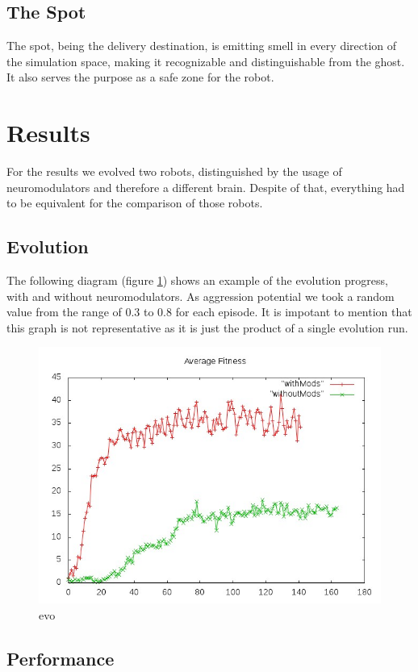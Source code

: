 \documentclass[12pt,fleqn,a4paper]{article}
\begin{document}
\subsection{The Spot}
The spot, being the delivery destination, is emitting smell in every direction of the simulation space, making it recognizable and distinguishable from the ghost. It also serves the purpose as a safe zone for the robot.

\section{Results}
For the results we evolved two robots, distinguished by the usage of neuromodulators and therefore a different brain. Despite of that, everything had to be equivalent for the comparison of those robots.
\newpage

\subsection{Evolution}
The following diagram (figure \ref{fig:diagram1}) shows an example of the evolution progress, with and without neuromodulators. As aggression potential we took a random value from the range of 0.3 to 0.8 for each episode. It is impotant to mention that this graph is not representative as it is just the product of a single evolution run.
\begin{figure}[h]
\centering
\includegraphics[scale=0.5]{img/evoAvg.jpg}
\caption{evo}
\label{fig:diagram1}
\end{figure}

\subsection{Performance}
\end{document}
